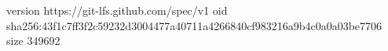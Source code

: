 version https://git-lfs.github.com/spec/v1
oid sha256:43f1c7ff3f2c59232d3004477a40711a4266840cf983216a9b4c0a0a03be7706
size 349692
